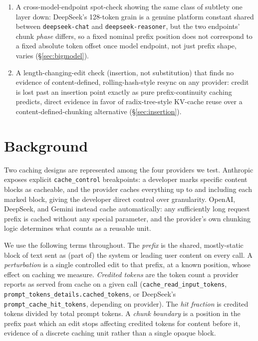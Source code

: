 \documentclass[11pt]{article}
\newcommand{\code}[1]{\texttt{#1}}
\begin{document}
\begin{enumerate}
  chunk boundaries are content-anchored, not fixed absolute-token addresses
  (\S\ref{sec:generalization}).
  \item A cross-model-endpoint spot-check showing the same class of
  subtlety one layer down: DeepSeek's 128-token grain is a genuine platform
  constant shared between \code{deepseek-chat} and \code{deepseek-reasoner},
  but the two endpoints' chunk \emph{phase} differs, so a fixed nominal
  prefix position does not correspond to a fixed absolute token offset once
  model endpoint, not just prefix shape, varies (\S\ref{sec:bigmodel}).
  \item A length-changing-edit check (insertion, not substitution) that
  finds no evidence of content-defined, rolling-hash-style resync on any
  provider: credit is lost past an insertion point exactly as pure
  prefix-continuity caching predicts, direct evidence in favor of
  radix-tree-style KV-cache reuse over a content-defined-chunking
  alternative (\S\ref{sec:insertion}).
\end{enumerate}

\section{Background}
\label{sec:background}

Two caching designs are represented among the four providers we test.
Anthropic exposes explicit \code{cache\_control} breakpoints: a developer
marks specific content blocks as cacheable, and the provider caches
everything up to and including each marked block, giving the developer
direct control over granularity. OpenAI, DeepSeek, and Gemini instead cache
automatically: any sufficiently long request prefix is cached without any
special parameter, and the provider's own chunking logic determines what
counts as a reusable unit.

We use the following terms throughout. The \emph{prefix} is the shared,
mostly-static block of text sent as (part of) the system or leading user
content on every call. A \emph{perturbation} is a single controlled edit to
that prefix, at a known position, whose effect on caching we measure.
\emph{Credited tokens} are the token count a provider reports as served from
cache on a given call (\code{cache\_read\_input\_tokens},
\code{prompt\_tokens\_details.cached\_tokens}, or DeepSeek's
\code{prompt\_cache\_hit\_tokens}, depending on provider). The \emph{hit
fraction} is credited tokens divided by total prompt tokens. A \emph{chunk
boundary} is a position in the prefix past which an edit stops affecting
credited tokens for content before it, evidence of a discrete caching unit
rather than a single opaque block.
\end{document}
